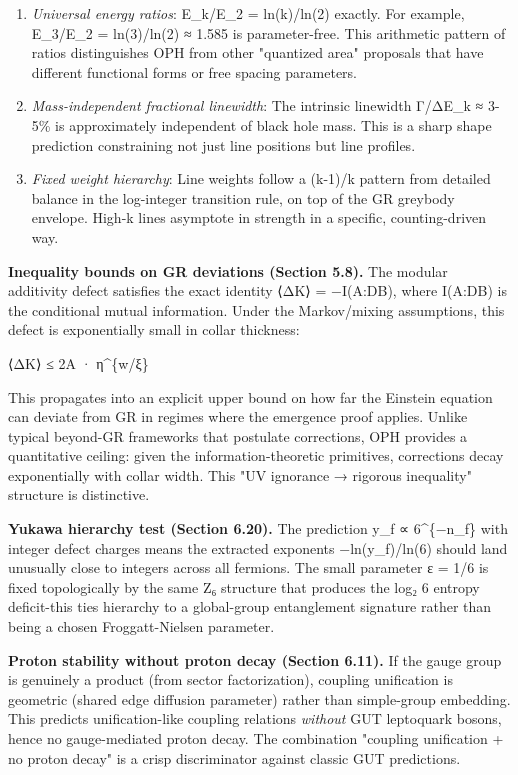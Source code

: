 \begin{enumerate}
\def\labelenumi{\arabic{enumi}.}
\item
  \emph{Universal energy ratios}: E\_k/E\_2 = ln(k)/ln(2) exactly. For example, E\_3/E\_2 = ln(3)/ln(2) ≈ 1.585 is parameter-free. This arithmetic pattern of ratios distinguishes OPH from other "quantized area" proposals that have different functional forms or free spacing parameters.
\item
  \emph{Mass-independent fractional linewidth}: The intrinsic linewidth Γ/ΔE\_k ≈ 3-5\% is approximately independent of black hole mass. This is a sharp shape prediction constraining not just line positions but line profiles.
\item
  \emph{Fixed weight hierarchy}: Line weights follow a (k-1)/k pattern from detailed balance in the log-integer transition rule, on top of the GR greybody envelope. High-k lines asymptote in strength in a specific, counting-driven way.
\end{enumerate}

\textbf{Inequality bounds on GR deviations (Section 5.8).} The modular additivity defect satisfies the exact identity ⟨ΔK⟩ = −I(A:D\textbar B), where I(A:D\textbar B) is the conditional mutual information. Under the Markov/mixing assumptions, this defect is exponentially small in collar thickness:

\textbar⟨ΔK⟩\textbar{} ≤ 2\textbar A\textbar{} · η\^{}\{w/ξ\}

This propagates into an explicit upper bound on how far the Einstein equation can deviate from GR in regimes where the emergence proof applies. Unlike typical beyond-GR frameworks that postulate corrections, OPH provides a quantitative ceiling: given the information-theoretic primitives, corrections decay exponentially with collar width. This "UV ignorance → rigorous inequality" structure is distinctive.

\textbf{Yukawa hierarchy test (Section 6.20).} The prediction y\_f ∝ 6\^{}\{−n\_f\} with integer defect charges means the extracted exponents −ln(y\_f)/ln(6) should land unusually close to integers across all fermions. The small parameter ε = 1/6 is fixed topologically by the same Z₆ structure that produces the log₂ 6 entropy deficit-this ties hierarchy to a global-group entanglement signature rather than being a chosen Froggatt-Nielsen parameter.

\textbf{Proton stability without proton decay (Section 6.11).} If the gauge group is genuinely a product (from sector factorization), coupling unification is geometric (shared edge diffusion parameter) rather than simple-group embedding. This predicts unification-like coupling relations \emph{without} GUT leptoquark bosons, hence no gauge-mediated proton decay. The combination "coupling unification + no proton decay" is a crisp discriminator against classic GUT predictions.

